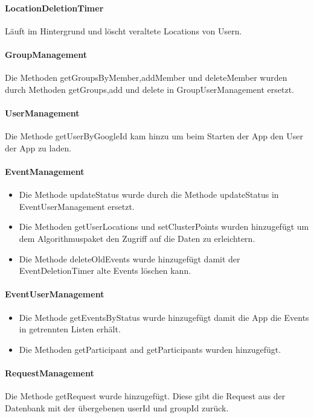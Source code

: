\documentclass{scrartcl}
\begin{document}
	\paragraph{LocationDeletionTimer}
	Läuft im Hintergrund und löscht veraltete Locations von Usern.
	\paragraph{GroupManagement}	
	Die Methoden getGroupsByMember,addMember und deleteMember wurden durch Methoden getGroups,add und delete in GroupUserManagement ersetzt.
	\paragraph{UserManagement}	
	Die Methode getUserByGoogleId kam hinzu um beim Starten der App den User der App zu laden.
	\paragraph{EventManagement}	
	\begin{itemize}
\item 	Die Methode updateStatus wurde durch die Methode updateStatus in EventUserManagement ersetzt.
\item 	Die Methoden getUserLocations und setClusterPoints wurden hinzugefügt um dem Algorithmuspaket den Zugriff auf die Daten zu erleichtern.
\item	Die Methode deleteOldEvents wurde hinzugefügt damit der EventDeletionTimer alte Events löschen kann.	
	\end{itemize}

	\paragraph{EventUserManagement}		
	
	\begin{itemize}
\item 		Die Methode getEventsByStatus wurde hinzugefügt damit die App die Events in getrennten Listen erhält.
\item Die Methoden getParticipant and getParticipants wurden hinzugefügt.
	\end{itemize}

		\paragraph{RequestManagement}		
	Die Methode getRequest wurde hinzugefügt. Diese gibt die Request aus der Datenbank mit der übergebenen userId und groupId zurück.
\end{document}
